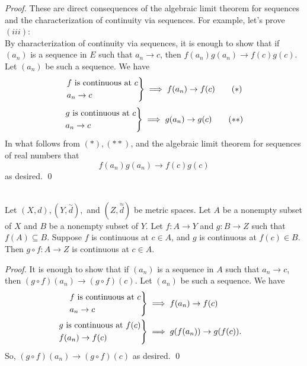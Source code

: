 \begin{proof} \leavevmode
    These are direct consequences of the algebraic limit theorem for sequences and the characterization of continuity via sequences. For example, let's prove $(iii)$: \\
    By characterization of continuity via sequences, it is enough to show that if $(a_n)$ is a sequence in $E$ such that $a_n \to c$, then $f(a_n)g(a_n) \to f(c)g(c).$ Let $(a_n)$ be such a sequence. We have
    \begin{equation*}
        \begin{rcases*}
            f \text{ is continuous at } c \\
            a_n \to c
        \end{rcases*} \implies f(a_n) \to f(c)
        \tag{$*$}
    \end{equation*}
    \begin{equation*}
        \begin{rcases*}
            g \text{ is continuous at } c \\
            a_n \to c
        \end{rcases*} \implies g(a_n) \to g(c)
        \tag{$**$}
    \end{equation*}
    In what follows from $(*),(**)$, and the algebraic limit theorem for sequences of real numbers that
    $$f(a_n)g(a_n) \to f(c)g(c)$$
    as desired. \qed
\end{proof}

\begin{theorem} \leavevmode \\
    \label{thm4.7}
    Let $(X,d), (Y,\overset{\sim}{d}),$ and $(Z, \overset{\approx}{d})$ be metric spaces. Let $A$ be a nonempty subset of $X$ and $B$ be a nonempty subset of $Y$. Let $f: A \to Y$ and $g: B \to Z$ such that $f(A) \subseteq B.$ Suppose $f$ is continuous at $c \in A$, and $g$ is continuous at $f(c) \in B$. Then $g \circ f: A \to Z$ is continuous at $c \in A$.
\end{theorem}

\begin{proof}
    It is enough to show that if $(a_n)$ is a sequence in $A$ such that $a_n \to c$, then $(g\circ f)(a_n) \to (g \circ f)(c).$ Let $(a_n)$ be such a sequence. We have 
    \begin{align*}
        \begin{rcases*}
            f \text{ is continuous at } c \\
            a_n \to c
        \end{rcases*} &\implies f(a_n) \to f(c) \\
        \begin{rcases*}
            g \text{ is continuous at } f(c) \\
            f(a_n) \to f(c)
        \end{rcases*} &\implies g(f(a_n)) \to g(f(c)).
    \end{align*}
    So, $(g \circ f)(a_n) \to (g \circ f)(c)$ as desired. \qed
\end{proof}


